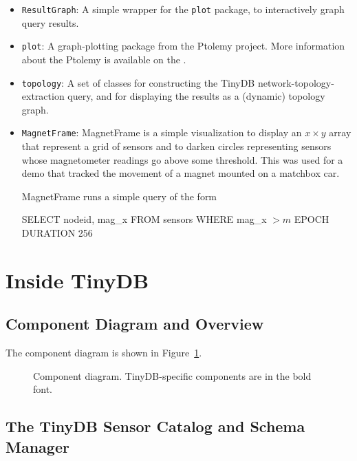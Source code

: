 \documentclass[11pt]{article}
\begin{document}
\begin{itemize}
\item {\tt ResultGraph}: A simple wrapper for the {\tt plot} package, to
  interactively graph query results.

\item {\tt plot}: A graph-plotting package from the Ptolemy project.  More information about the Ptolemy is available on the .

\item {\tt topology}: A set of classes for constructing the TinyDB
  network-topology-extraction query, and for displaying the results as
  a (dynamic) topology graph.

\item {\tt MagnetFrame}: MagnetFrame is a simple visualization to
    display an $x \times y$ array that represent a grid of sensors and
    to darken circles representing sensors whose magnetometer readings
    go above some threshold.  This was used for a demo that tracked
    the movement of a magnet mounted on a matchbox car.
    
    MagnetFrame runs a simple query of the form
    
    {\sf SELECT nodeid, mag\_x FROM sensors WHERE mag\_x $> m$
    EPOCH DURATION 256}
\end{itemize}


\section{Inside TinyDB} \label{sec:inside}

\subsection{Component Diagram and Overview}
The component diagram is shown in Figure~\ref{fig:components}.

\begin{figure}[ht]
\caption{Component diagram.  TinyDB-specific components are in the
  bold font.}
\label{fig:components}
\end{figure}

\subsection {The TinyDB Sensor Catalog and Schema Manager}
\label{sec:catalog}
\end{document}
